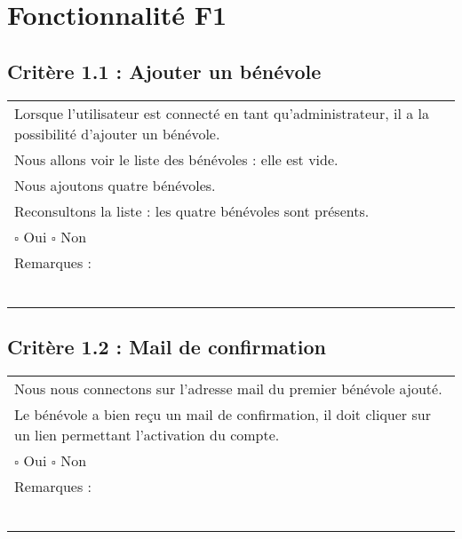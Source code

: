 
\section{Fonctionnalité F1}

	\subsection*{Critère 1.1 : Ajouter un bénévole}
	
		\begin{center}
    	 		\begin{tabular}[h]{|p{}|}
			\hline
				Lorsque l'utilisateur est connecté en tant qu'administrateur, il a la possibilité d'ajouter un bénévole. \\
				Nous allons voir le liste des bénévoles : elle est vide. \\
				Nous ajoutons quatre bénévoles. \\
				Reconsultons la liste : les quatre bénévoles sont présents. \\
				
				$\square$ Oui \hfill \hfill $\square$ Non \\\hline Remarques : \\ ~\\
			 \\\hline
     		\end{tabular}
  		\end{center}	
  		
  		
	\subsection*{Critère 1.2 : Mail de confirmation}
	
		\begin{center}
    	 		\begin{tabular}[h]{|p{}|}
			\hline
				Nous nous connectons sur l'adresse mail du premier bénévole ajouté. \\
				Le bénévole a bien reçu un mail de confirmation, il doit cliquer sur un lien permettant l'activation du compte. \\ 
				
				$\square$ Oui  \hfill \hfill $\square$ Non \\\hline Remarques : \\ ~\\
			 \\\hline
     		\end{tabular}
  		\end{center}	
  		
